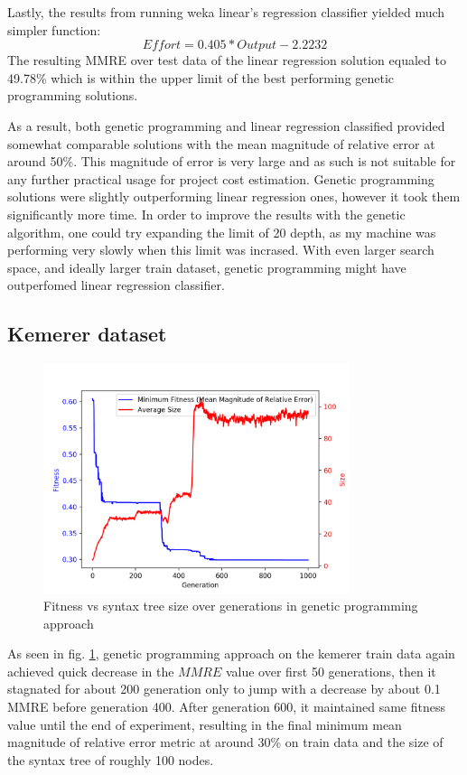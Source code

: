 \documentclass[12pt]{article}
\begin{document}
Lastly, the results from running weka linear's regression classifier yielded much simpler function:
\begin{equation}
  Effort = 0.405  * Output -2.2232
\end{equation}
The resulting MMRE over test data of the linear regression solution equaled to 49.78\% which is within the upper limit of the best performing genetic programming solutions.

As a result, both genetic programming and linear regression classified provided somewhat comparable solutions with the mean magnitude of relative error at around 50\%. This magnitude of error is very large and as such is not suitable for any further practical usage for project cost estimation. Genetic programming solutions were slightly outperforming linear regression ones, however it took them significantly more time.
In order to improve the results with the genetic algorithm, one could try expanding the limit of 20 depth, as my machine was performing very slowly when this limit was incrased. With even larger search space, and ideally larger train dataset, genetic programming might have outperfomed linear regression classifier.

\subsection{Kemerer dataset}

\begin{figure}[H]
  \centering
  \includegraphics[width=0.8\textwidth]{results/kemerer/mmre_vs_size}
  \caption{Fitness vs syntax tree size over generations in genetic programming approach}
  \label{fit_vs_syn_kemerer}
\end{figure}
As seen in fig. \ref{fit_vs_syn_kemerer}, genetic programming approach on the kemerer train data again achieved quick decrease in the $MMRE$ value over first 50 generations, then it stagnated for about 200 generation only to jump with a decrease by about 0.1 MMRE before generation 400. After generation 600, it maintained same fitness value until the end of experiment, resulting in the final minimum mean magnitude of relative error metric at around 30\% on train data and the size of the syntax tree of roughly 100 nodes.
\end{document}
